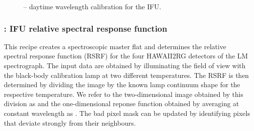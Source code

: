 \begin{figure}[hb]
    \centering
    \def \globalscale {0.700000}
    \fontsize{10}{12}\selectfont
    
  \caption[Recipe: ]{ --
    daytime wavelength calibration for the IFU.}
  \label{fig:metis_ifu_wavecal}
\end{figure}


\clearpage
\subsubsection{: IFU relative spectral response function}
\label{sssec:ifu_rsrf}
\label{rec:metis_ifu_rsrf}

This recipe creates a spectroscopic master flat and determines the
relative spectral response function (RSRF) for the four HAWAII2RG
detectors of the LM spectrograph. The input data are obtained by
illuminating the field of view with the black-body calibration lamp at
two different temperatures. The RSRF is then determined by dividing
the image by the known lamp continuum shape for the respective
temperature. We refer to the two-dimensional image obtained by this
division as  and the one-dimensional reponse
function obtained by averaging at constant wavelength as
. The bad pixel mask can be updated by identifying pixels
that deviate strongly from their neighbours.

